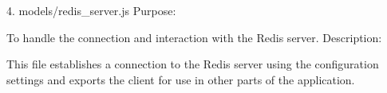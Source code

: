 4. models/redis_server.js
Purpose:

To handle the connection and interaction with the Redis server.
Description:

This file establishes a connection to the Redis server using the configuration settings
and exports the client for use in other parts of the application.
